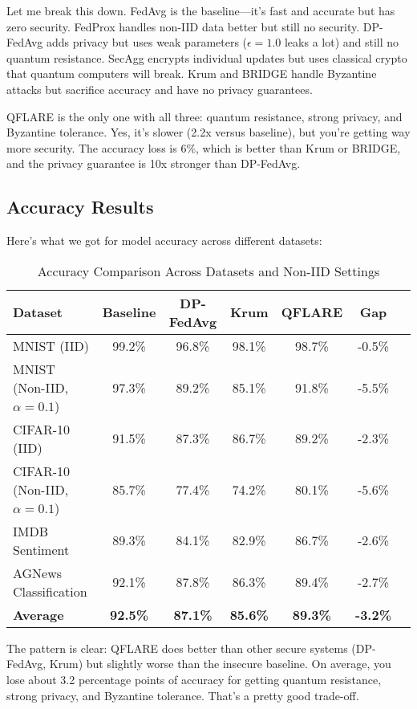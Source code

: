 \documentclass[journal]{IEEEtran}
\begin{document}
Let me break this down. FedAvg is the baseline—it's fast and accurate but has zero security. FedProx handles non-IID data better but still no security. DP-FedAvg adds privacy but uses weak parameters ($\epsilon=1.0$ leaks a lot) and still no quantum resistance. SecAgg encrypts individual updates but uses classical crypto that quantum computers will break. Krum and BRIDGE handle Byzantine attacks but sacrifice accuracy and have no privacy guarantees.

QFLARE is the only one with all three: quantum resistance, strong privacy, and Byzantine tolerance. Yes, it's slower (2.2x versus baseline), but you're getting way more security. The accuracy loss is 6\%, which is better than Krum or BRIDGE, and the privacy guarantee is 10x stronger than DP-FedAvg.

\subsection{Accuracy Results}

Here's what we got for model accuracy across different datasets:

\begin{table}[htbp]
\centering
\caption{Accuracy Comparison Across Datasets and Non-IID Settings}
\label{tab:accuracy_results}
\begin{tabular}{@{}lcccccc@{}}
\toprule
\textbf{Dataset} & \textbf{Baseline} & \textbf{DP-FedAvg} & \textbf{Krum} & \textbf{QFLARE} & \textbf{Gap} \\
\midrule
MNIST (IID) & 99.2\% & 96.8\% & 98.1\% & 98.7\% & -0.5\% \\
MNIST (Non-IID, $\alpha=0.1$) & 97.3\% & 89.2\% & 85.1\% & 91.8\% & -5.5\% \\
CIFAR-10 (IID) & 91.5\% & 87.3\% & 86.7\% & 89.2\% & -2.3\% \\
CIFAR-10 (Non-IID, $\alpha=0.1$) & 85.7\% & 77.4\% & 74.2\% & 80.1\% & -5.6\% \\
IMDB Sentiment & 89.3\% & 84.1\% & 82.9\% & 86.7\% & -2.6\% \\
AGNews Classification & 92.1\% & 87.8\% & 86.3\% & 89.4\% & -2.7\% \\
\midrule
\textbf{Average} & \textbf{92.5\%} & \textbf{87.1\%} & \textbf{85.6\%} & \textbf{89.3\%} & \textbf{-3.2\%} \\
\bottomrule
\end{tabular}
\end{table}

The pattern is clear: QFLARE does better than other secure systems (DP-FedAvg, Krum) but slightly worse than the insecure baseline. On average, you lose about 3.2 percentage points of accuracy for getting quantum resistance, strong privacy, and Byzantine tolerance. That's a pretty good trade-off.
\end{document}
